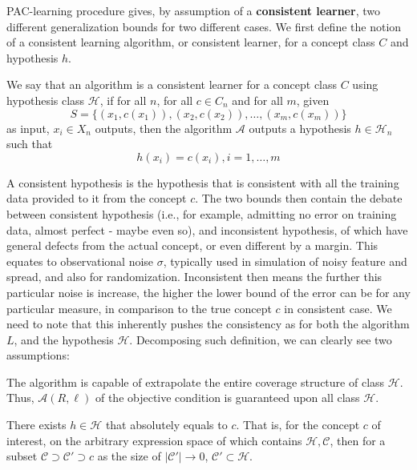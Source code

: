 \documentclass[
  journal=largetwo,
  year=2025,
  volume=37,
]{cup-journal}
\begin{document}
PAC-learning procedure gives, by assumption of a \textbf{consistent learner}, two different generalization bounds for two different cases. We first define the notion of a consistent learning algorithm, or consistent learner, for a concept class $C$ and hypothesis $h$. 
{
    \small
    \begin{definition}
    We say that an algorithm is a consistent learner for a concept class $C$ using hypothesis class $\mathcal{H}$, if for all $n$, for all $c\in C_n$ and for all $m$, given 
    \begin{equation*}
        S = \{ (x_1, c(x_1)) , (x_2, c(x_2)) ,\dots, (x_m, c(x_m))  \} 
    \end{equation*}
    as input, $x_i \in X_n$ outputs, then the algorithm $\mathcal{A}$ outputs a hypothesis $h\in \mathcal{H}_n$ such that $$h(x_i) = c(x_i) , i = 1,\dots,m$$ 
    \end{definition}
}
A consistent hypothesis is the hypothesis that is consistent with all the training data provided to it from the concept $c$. The two bounds then contain the debate between consistent hypothesis (i.e., for example, admitting no error on training data, almost perfect - maybe even so), and inconsistent hypothesis, of which have general defects from the actual concept, or even different by a margin. This equates to observational noise $\sigma$, typically used in simulation of noisy feature and spread, and also for randomization. Inconsistent then means the further this particular noise is increase, the higher the lower bound of the error can be for any particular measure, in comparison to the true concept $c$ in consistent case. We need to note that this inherently pushes the consistency as for both the algorithm $L$, and the hypothesis $\mathcal{H}$. Decomposing such definition, we can clearly see two assumptions:

\begin{assumption}
    The algorithm is capable of extrapolate the entire coverage structure of class $\mathcal{H}$. Thus, $\mathcal{A}(R,\ell)$ of the objective condition is guaranteed upon all class $\mathcal{H}$. 
\end{assumption}

\begin{assumption}
    There exists $h\in \mathcal{H}$ that absolutely equals to $c$. That is, for the concept $c$ of interest, on the arbitrary expression space of which contains $\mathcal{H},\mathcal{C}$, then for a subset $\mathcal{C}\supset\mathcal{C}'\supset c$ as the size of $|\mathcal{C}'|\to 0$, $\mathcal{C}'\subset \mathcal{H}$. 
\end{assumption}
\end{document}
